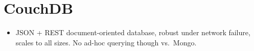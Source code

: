 \documentclass[10pt]{article}
\begin{document}
\section{CouchDB}

\begin{itemize}
    \item JSON + REST document-oriented database, robust under network failure,
        scales to all sizes. No ad-hoc querying though vs.\ Mongo.
\end{itemize}
\end{document}
